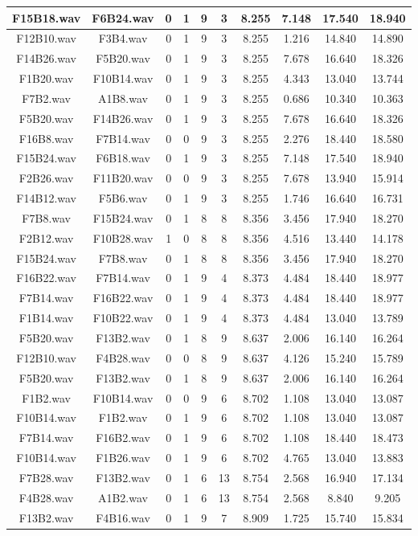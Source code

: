 \documentclass[11pt,a4paper]{book}
\begin{document}
\begin{longtable}[c]{|c|c|c|c|c|c|c|c|c|c|}
F15B18.wav&F6B24.wav&0&1&9&3&8.255&7.148&17.540&18.940\\ \hline
F12B10.wav&F3B4.wav&0&1&9&3&8.255&1.216&14.840&14.890\\ \hline
F14B26.wav&F5B20.wav&0&1&9&3&8.255&7.678&16.640&18.326\\ \hline
F1B20.wav&F10B14.wav&0&1&9&3&8.255&4.343&13.040&13.744\\ \hline
F7B2.wav&A1B8.wav&0&1&9&3&8.255&0.686&10.340&10.363\\ \hline
F5B20.wav&F14B26.wav&0&1&9&3&8.255&7.678&16.640&18.326\\ \hline
F16B8.wav&F7B14.wav&0&0&9&3&8.255&2.276&18.440&18.580\\ \hline
F15B24.wav&F6B18.wav&0&1&9&3&8.255&7.148&17.540&18.940\\ \hline
F2B26.wav&F11B20.wav&0&0&9&3&8.255&7.678&13.940&15.914\\ \hline
F14B12.wav&F5B6.wav&0&1&9&3&8.255&1.746&16.640&16.731\\ \hline
F7B8.wav&F15B24.wav&0&1&8&8&8.356&3.456&17.940&18.270\\ \hline
F2B12.wav&F10B28.wav&1&0&8&8&8.356&4.516&13.440&14.178\\ \hline
F15B24.wav&F7B8.wav&0&1&8&8&8.356&3.456&17.940&18.270\\ \hline
F16B22.wav&F7B14.wav&0&1&9&4&8.373&4.484&18.440&18.977\\ \hline
F7B14.wav&F16B22.wav&0&1&9&4&8.373&4.484&18.440&18.977\\ \hline
F1B14.wav&F10B22.wav&0&1&9&4&8.373&4.484&13.040&13.789\\ \hline
F5B20.wav&F13B2.wav&0&1&8&9&8.637&2.006&16.140&16.264\\ \hline
F12B10.wav&F4B28.wav&0&0&8&9&8.637&4.126&15.240&15.789\\ \hline
F5B20.wav&F13B2.wav&0&1&8&9&8.637&2.006&16.140&16.264\\ \hline
F1B2.wav&F10B14.wav&0&0&9&6&8.702&1.108&13.040&13.087\\ \hline
F10B14.wav&F1B2.wav&0&1&9&6&8.702&1.108&13.040&13.087\\ \hline
F7B14.wav&F16B2.wav&0&1&9&6&8.702&1.108&18.440&18.473\\ \hline
F10B14.wav&F1B26.wav&0&1&9&6&8.702&4.765&13.040&13.883\\ \hline
F7B28.wav&F13B2.wav&0&1&6&13&8.754&2.568&16.940&17.134\\ \hline
F4B28.wav&A1B2.wav&0&1&6&13&8.754&2.568&8.840&9.205\\ \hline
F13B2.wav&F4B16.wav&0&1&9&7&8.909&1.725&15.740&15.834\\ \hline

\end{longtable}
\end{document}
